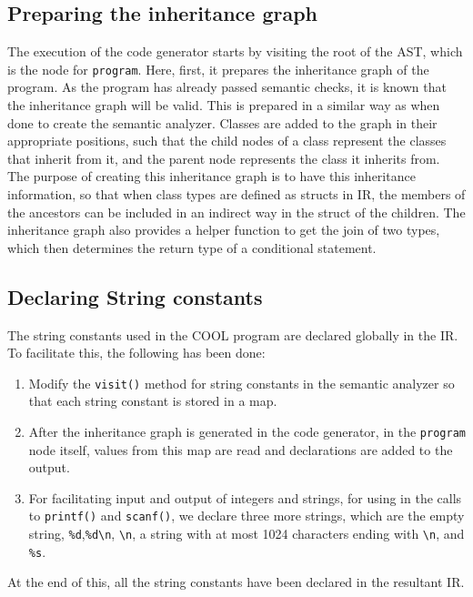 \documentclass{article}
\begin{document}
\subsection{Preparing the inheritance graph}
The execution of the code generator starts by visiting the root of the AST, which is the node for \verb|program|. Here, first, it prepares the inheritance graph of the program. As the program has already passed semantic checks, it is known that the inheritance graph will be valid. This is prepared in a similar way as when done to create the semantic analyzer. Classes are added to the graph in their appropriate positions, such that the child nodes of a class represent the classes that inherit from it, and the parent node represents the class it inherits from. The purpose of creating this inheritance graph is to have this inheritance information, so that when class types are defined as structs in IR, the members of the ancestors can be included in an indirect way in the struct of the children. The inheritance graph also provides a helper function to get the join of two types, which then determines the return type of a conditional statement.

\subsection{Declaring String constants}
The string constants used in the COOL program are declared globally in the IR. To facilitate this, the following has been done:
\begin{enumerate}
	\item Modify the \verb|visit()| method for string constants in the semantic analyzer so that each string constant is stored in a map.
	\item After the inheritance graph is generated in the code generator, in the \verb|program| node itself, values from this map are read and declarations are added to the output.
	\item For facilitating input and output of integers and strings, for using in the calls to \verb|printf()| and \verb|scanf()|, we declare three more strings, which are the empty string, \verb|%d|,\verb|%d\n|, \verb|\n|, a string with at most 1024 characters ending with \verb|\n|, and \verb|%s|.
\end{enumerate} 
At the end of this, all the string constants have been declared in the resultant IR.
\end{document}
